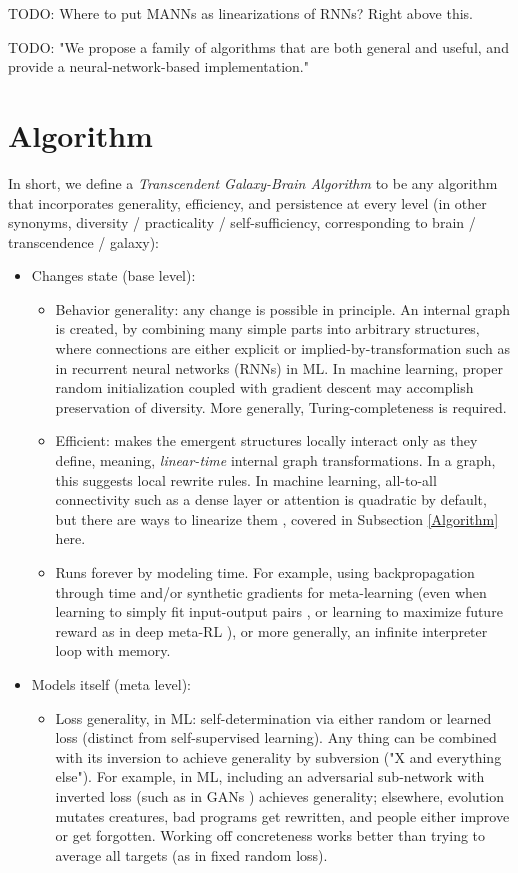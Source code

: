 \documentclass{article}
\begin{document}
    TODO: Where to put MANNs as linearizations of RNNs? Right above this.

    TODO: "We propose a family of algorithms that are both general and useful, and provide a neural-network-based implementation."

\section{Algorithm}

In short, we define a \textit{Transcendent Galaxy-Brain Algorithm} to be any algorithm that incorporates generality, efficiency, and persistence at every level (in other synonyms, diversity / practicality / self-sufficiency, corresponding to brain / transcendence / galaxy):

\begin{itemize}
\item Changes state (base level):
\begin{itemize}
\item Behavior generality: any change is possible in principle. An internal graph is created, by combining many simple parts into arbitrary structures, where connections are either explicit or implied-by-transformation such as in recurrent neural networks (RNNs) in ML. In machine learning, proper random initialization coupled with gradient descent may accomplish preservation of diversity. More generally, Turing-completeness is required.
\item Efficient: makes the emergent structures locally interact only as they define, meaning, \textit{linear-time} internal graph transformations. In a graph, this suggests local rewrite rules. In machine learning, all-to-all connectivity such as a dense layer or attention is quadratic by default, but there are ways to linearize them \cite{tolstikhin2021mlpmixer} \cite{schlag2021linear}, covered in Subsection \ref{Algorithm} here.
\item Runs forever by modeling time. For example, using backpropagation through time and/or synthetic gradients for meta-learning (even when learning to simply fit input-output pairs \cite{santoro2016oneshot}, or learning to maximize future reward as in deep meta-RL \cite{DBLP:journals/corr/WangKTSLMBKB16}), or more generally, an infinite interpreter loop with memory.
\end{itemize}
\item Models itself (meta level):
\begin{itemize}
\item Loss generality, in ML: self-determination via either random or learned loss (distinct from self-supervised learning). Any thing can be combined with its inversion to achieve generality by subversion ("X and everything else"). For example, in ML, including an adversarial sub-network with inverted loss (such as in GANs \cite{goodfellow2014generative}) achieves generality; elsewhere, evolution mutates creatures, bad programs get rewritten, and people either improve or get forgotten. Working off concreteness works better than trying to average all targets (as in fixed random loss).

\end{itemize}
\end{itemize}
\end{document}
